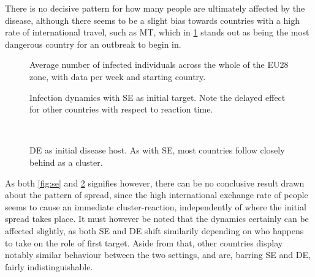 \documentclass[a4paper,12pt]{article}
\theoremstyle{plain}
\theoremstyle{definition}
\begin{document}
   There is no decisive pattern for how many people are ultimately affected by 
   the disease, although there seems to be a slight bias towards countries with 
   a high rate of international travel, such as MT, which in \cref{fig:start} 
   stands out as being the most dangerous country for an outbreak to begin in. 

   \begin{figure}[H]
      \centering
      \resizebox{\textwidth}{!}{}
      \caption{Average number of infected individuals across the whole of the
      EU28 zone, with data per week and starting country.}
      \label{fig:start}            
   \end{figure}

   \begin{figure}[H]
      \vspace*{1cm}
      \hspace*{-2cm}
      \centering
      \begin{minipage}[t]{.6\textwidth}		
         \vspace{0pt}
         \centering
          \resizebox{\columnwidth}{!}{}
          \caption{Infection dynamics with SE as initial target. Note the
          delayed effect for other countries with respect to reaction
          time.}
          \label{fig:se}
      \end{minipage}~\hspace*{1em}
      \begin{minipage}[t]{.6\textwidth}		
         \vspace{0pt}
         \centering
         \resizebox{\columnwidth}{!}{}
         \caption{DE as initial disease host. As with SE, most countries
         follow closely behind as a cluster.}
         \label{fig:de}
      \end{minipage}
   \end{figure}

   As both \cref{fig:se} and \cref{fig:de} signifies however, there can be no conclusive
   result drawn about the pattern of spread, since the high international
   exchange rate of people seems to cause an immediate cluster-reaction,
   independently of where the initial spread takes place. It must however be
   noted that the dynamics certainly can be affected slightly, as both SE and DE
   shift similarily depending on who happens to take on the role of first
   target. Aside from that, other countries display notably similar behaviour between
   the two settings, and are, barring SE and DE, fairly indistinguishable.
\end{document}
